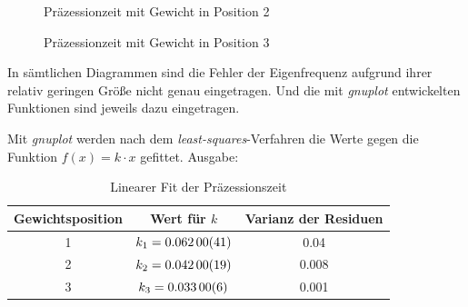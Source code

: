 \begin{figure}[H]
  \centering
  \caption{Präzessionzeit mit Gewicht in Position 2}
  \label{fig:pos1}
\end{figure}

\begin{figure}[H]
  \centering
  \caption{Präzessionzeit mit Gewicht in Position 3}
  \label{fig:pos1}
\end{figure}

In sämtlichen Diagrammen sind die Fehler der Eigenfrequenz aufgrund ihrer relativ geringen Größe nicht genau eingetragen. Und die mit \emph{gnuplot} entwickelten Funktionen sind jeweils dazu eingetragen.


Mit \emph{gnuplot} werden nach dem \emph{least-squares}-Verfahren die Werte gegen die Funktion $f(x)=k\cdot x$ gefittet. Ausgabe:

\begin{table}[H]
  \centering
  \begin{tabular}{c | c | c}
    Gewichtsposition & Wert für $k$ & Varianz der Residuen \\ \hline
    1 & $k_1=\num{0,062\pm 0,00041}$ & \num{0,04} \\
    2 & $k_2=\num{0,042\pm0,00019}$ & \num{0,008}\\
    3 & $k_3=\num{0,033\pm 0,00006}$ & \num{0,001}\\
  \end{tabular}
  \caption{Linearer Fit der Präzessionszeit}
  \label{tab:präzefit}
\end{table}

